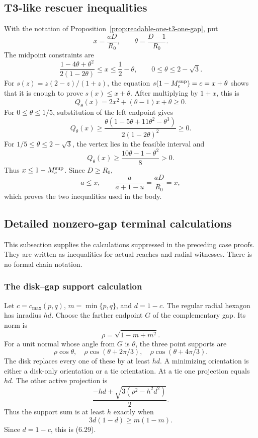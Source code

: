 \subsection{T3-like rescuer inequalities}
\label{subsec:calc-t3-rescuer}

With the notation of Proposition~\ref{prop:readable-one-t3-one-gap}, put
\[
 x=\frac{aD}{R_0},\qquad \theta=\frac{D-1}{R_0}.
\]
The midpoint constraints are
\[
 \frac{1-4\theta+\theta^2}{2(1-2\theta)}
 \le x\le\frac12-\theta,
 \qquad 0\le\theta\le2-\sqrt3.
\]
For $s(z)=z(2-z)/(1+z)$, the equation
$s(1-M_c^{\rm sup})=c=x+\theta$ shows that it is enough to prove
$s(x)\le x+\theta$.  After multiplying by $1+x$, this is
\[
 Q_\theta(x)=2x^2+(\theta-1)x+\theta\ge0.
\]
For $0\le\theta\le1/5$, substitution of the left endpoint gives
\[
 Q_\theta(x)\ge
 \frac{\theta(1-5\theta+11\theta^2-\theta^3)}
 {2(1-2\theta)^2}\ge0.
\]
For $1/5\le\theta\le2-\sqrt3$, the vertex lies in the feasible interval and
\[
 Q_\theta(x)\ge\frac{10\theta-1-\theta^2}{8}>0.
\]
Thus $x\le1-M_c^{\rm sup}$.  Since $D\ge R_0$,
\[
 a\le x,
 \qquad
 \frac{a}{a+1-u}=\frac{aD}{R_0}=x,
\]
which proves the two inequalities used in the body.

\subsection{Detailed nonzero-gap terminal calculations}
\label{subsec:new-detailed-direct-certificates}

This subsection supplies the calculations suppressed in the preceding case
proofs.  They are written as inequalities for actual reaches and radial
witnesses.  There is no formal chain notation.

\subsubsection{The disk--gap support calculation}
\label{subsec:calc-disk-gap}

Let $c=c_{\max}(p,q)$, $m=\min\{p,q\}$, and
$d=1-c$.  The regular radial hexagon has inradius $hd$.  Choose the farther
endpoint $G$ of the complementary gap.  Its norm is
\[
 \rho=\sqrt{1-m+m^2}.
\]
For a unit normal whose angle from $G$ is $\theta$, the three point supports
are
\[
 \rho\cos\theta,
 \quad
 \rho\cos(\theta+2\pi/3),
 \quad
 \rho\cos(\theta+4\pi/3).
\]
The disk replaces every one of these by at least $hd$.  A minimizing
orientation is either a disk-only orientation or a tie orientation.  At a tie
one projection equals $hd$.  The other active projection is
\[
 \frac{-hd+\sqrt{3(\rho^2-h^2d^2)}}2.
\]
Thus the support sum is at least $h$ exactly when
\[
 3d(1-d)\ge m(1-m).
 \tag{6.51}
\]
Since $d=1-c$, this is (6.29).

